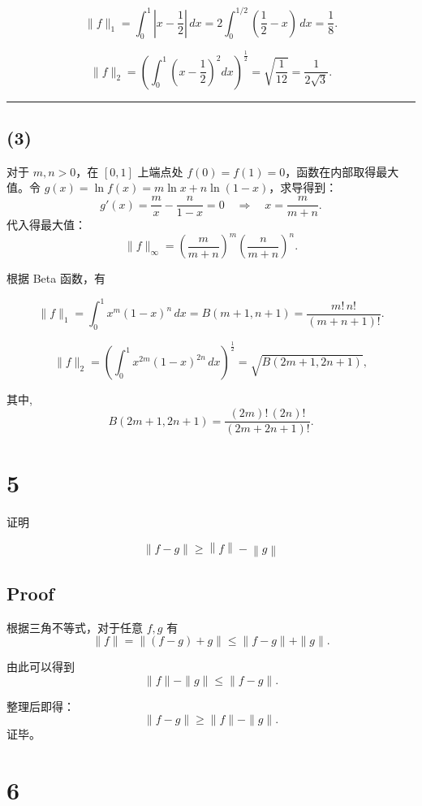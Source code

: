 \documentclass[11pt]{article}
\begin{document}
\[
\|f\|_{1} = \int_0^1 \left|x-\frac{1}{2}\right|\,dx = 2\int_0^{1/2} \left(\frac{1}{2}-x\right)\,dx = \frac{1}{8}.
\]

\[
\|f\|_{2} = \left(\int_0^1 \left(x-\frac{1}{2}\right)^2 dx\right)^{\frac{1}{2}}=\sqrt{\frac{1}{12}} = \frac{1}{2\sqrt{3}}.
\]

\begin{center}\rule{0.5\linewidth}{0.5pt}\end{center}

\subsection{(3)}\label{section-2}

对于 \(m,n>0\)，在 \([0,1]\) 上端点处
\(f(0)=f(1)=0\)，函数在内部取得最大值。令
\(g(x)=\ln f(x)= m\ln x+n\ln(1-x)\)，求导得到： \[
g'(x)=\frac{m}{x}-\frac{n}{1-x}=0 \quad \Longrightarrow \quad x=\frac{m}{m+n}.
\] 代入得最大值： \[
\|f\|_{\infty} = \left(\frac{m}{m+n}\right)^m \left(\frac{n}{m+n}\right)^n.
\]

根据 Beta 函数，有

\[
\|f\|_{1} = \int_0^1 x^m(1-x)^n\,dx = B(m+1,n+1) = \frac{m! \, n!}{(m+n+1)!}.
\]

\[
\|f\|_{2} = \left(\int_0^1 x^{2m}(1-x)^{2n}\,dx\right)^{\frac{1}{2}} = \sqrt{B(2m+1,2n+1)},
\]

其中, \[
B(2m+1,2n+1) = \frac{(2m)! \, (2n)!}{(2m+2n+1)!}.
\]

    \section{5}\label{section}

证明

\[
\left\lVert f - g\right\rVert \geqslant \left\lVert f\right\rVert  - \left\lVert g\right\rVert 
\]

    \subsection{Proof}\label{proof}

根据三角不等式，对于任意 \(f, g\) 有 \[
   \|f\| = \|(f-g) + g\| \leqslant \|f-g\| + \|g\|.
   \]

由此可以得到 \[
   \|f\| - \|g\| \leqslant \|f-g\|.
   \]

整理后即得： \[
   \|f-g\| \geqslant \|f\| - \|g\|.
   \] 证毕。

    \section{6}\label{section}
\end{document}
